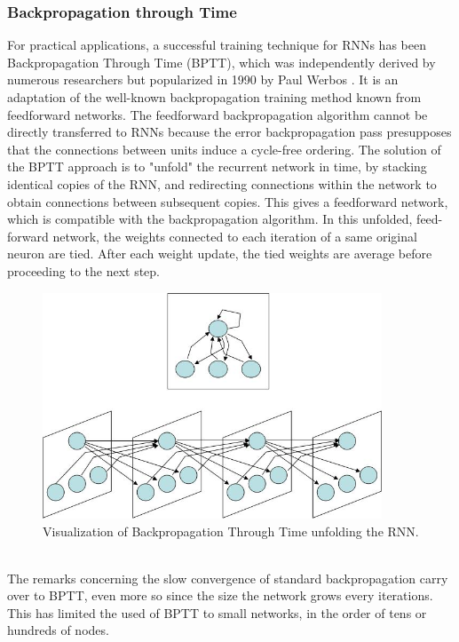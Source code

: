 \documentclass[12pt,oneside]{CUNY_CS_PhD}
\begin{document}
\subsubsection{Backpropagation through Time}
For practical applications, a successful training technique for RNNs has been Backpropagation Through Time (BPTT), which was independently derived by numerous researchers but popularized in 1990 by Paul Werbos \cite{werbos_backpropagation_1990}. It is an adaptation of the well-known backpropagation training method known from feedforward networks. The feedforward backpropagation algorithm cannot be directly transferred to RNNs because the error backpropagation pass presupposes that the connections between units induce a cycle-free ordering. The solution of the BPTT approach is to "unfold" the recurrent network in time, by stacking identical copies of the RNN, and redirecting connections within the network to obtain connections between subsequent copies. This gives a feedforward network, which is compatible with the backpropagation algorithm. In this unfolded, feed-forward network, the weights connected to each iteration of a same original neuron are tied. After each weight update, the tied weights are average before proceeding to the next step.
\begin{figure}[!htbp]
\centering
\includegraphics[width=0.9\textwidth]{pictures/bptt-influence.png}
\caption{Visualization of Backpropagation Through Time unfolding the RNN.}
\label{fig:bptt}
\end{figure}\\
The remarks concerning the slow convergence of standard backpropagation carry over to BPTT, even more so since the size the network grows every iterations. This has limited the used of BPTT to small networks, in the order of tens or hundreds of nodes.\\
\end{document}

